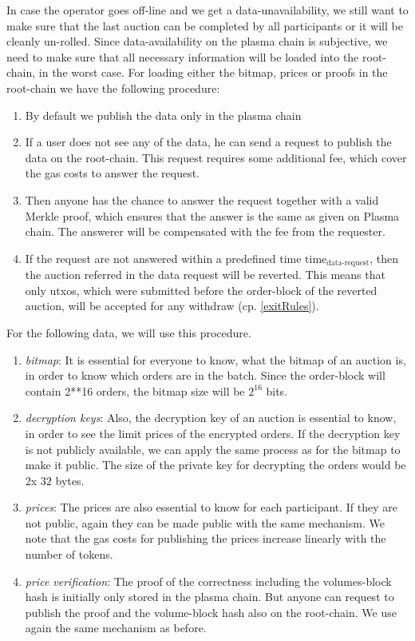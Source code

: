 \documentclass[11pt,parskip=full]{scrartcl}%
\begin{document}
\label{enforceAvailablity}
In case the operator goes off-line and we get a data-unavailability, we still want to make sure that the last auction can be completed by all participants or it will be cleanly un-rolled. 
Since data-availability on the plasma chain is subjective, we need to make sure that all necessary information will be loaded into the root-chain, in the worst case. \newline
For loading either the bitmap, prices or proofs in the root-chain we have the following procedure:
\begin{enumerate}
\item By default we publish the data only in the plasma chain
\item If a user does not see any of the data, he can send a request to publish the data on the root-chain. This request requires some additional fee, which cover the gas costs to answer the request.
\item Then anyone has the chance to answer the request together with a valid Merkle proof, which ensures that the answer is the same as given on Plasma chain. The answerer will be compensated with the fee from the requester.
\item If the request are not answered within a predefined time $\text{time}_\text{data-request}$, then the auction referred in the data request will be reverted.
This means that only utxos, which were submitted before the order-block of the reverted auction, will be accepted for any withdraw (cp. \ref{exitRules}). 
\end{enumerate}

For the following data, we will use this procedure.
\begin{enumerate}
\item \emph{bitmap}:
It is essential for everyone to know, what the bitmap of an auction is, in order to know which orders are in the batch. Since the order-block will contain 2**16 orders, the bitmap size will be $2^{16}$ bits. 


\item \emph{decryption keys}:
Also, the decryption key of an auction is essential to know, in order to see the limit prices of the encrypted orders. 
If the decryption key is not publicly available, we can apply the same process as for the bitmap to make it public. The size of the private key for decrypting the orders would be 2x $32$ bytes.

\item \emph{prices}:
The prices are also essential to know for each participant. 
If they are not public, again they can be made public with the same mechanism. 
We note that the gas costs for publishing the prices increase linearly with the number of tokens.

\item \emph{price verification}:
The proof of the correctness including the volumes-block hash is initially only stored in the plasma chain. 
But anyone can request to publish the proof and the volume-block hash also on the root-chain. 
We use again the same mechanism as before. 
\end{enumerate}
\end{document}
